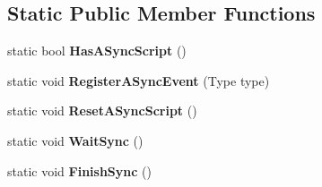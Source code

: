 \subsection*{Static Public Member Functions}
\begin{DoxyCompactItemize}
\item 
\hypertarget{classlib_wather_debugger_1_1_script_1_1_debug_script_a033eacabb647d1dbeed3f1a9a5f390db}{static bool {\bfseries Has\+A\+Sync\+Script} ()}\label{classlib_wather_debugger_1_1_script_1_1_debug_script_a033eacabb647d1dbeed3f1a9a5f390db}

\item 
\hypertarget{classlib_wather_debugger_1_1_script_1_1_debug_script_a6dbb35a31f0da067276200f0a863ea01}{static void {\bfseries Register\+A\+Sync\+Event} (Type type)}\label{classlib_wather_debugger_1_1_script_1_1_debug_script_a6dbb35a31f0da067276200f0a863ea01}

\item 
\hypertarget{classlib_wather_debugger_1_1_script_1_1_debug_script_af68f70168918bd65234f0d4c6c46a69f}{static void {\bfseries Reset\+A\+Sync\+Script} ()}\label{classlib_wather_debugger_1_1_script_1_1_debug_script_af68f70168918bd65234f0d4c6c46a69f}

\item 
\hypertarget{classlib_wather_debugger_1_1_script_1_1_debug_script_a29a1b44e375d8d4958a9367217fc3bcb}{static void {\bfseries Wait\+Sync} ()}\label{classlib_wather_debugger_1_1_script_1_1_debug_script_a29a1b44e375d8d4958a9367217fc3bcb}

\item 
\hypertarget{classlib_wather_debugger_1_1_script_1_1_debug_script_a4a70ffafd2f5878046520b9ba357a1ec}{static void {\bfseries Finish\+Sync} ()}\label{classlib_wather_debugger_1_1_script_1_1_debug_script_a4a70ffafd2f5878046520b9ba357a1ec}

\end{DoxyCompactItemize}
